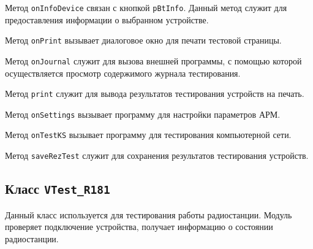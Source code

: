 \begin{enum}
	\item Метод \texttt{onInfoDevice} связан с кнопкой \texttt{pBtInfo}. Данный метод служит для предоставления
		информации о выбранном устройстве.

	\item Метод \texttt{onPrint} вызывает диалоговое окно для печати тестовой страницы.

	\item Метод \texttt{onJournal} служит для вызова внешней программы, с помощью которой осуществляется просмотр
		содержимого журнала тестирования.

	\item Метод \texttt{print} служит для вывода результатов тестирования устройств на печать.

	\item Метод \texttt{onSettings} вызывает программу для настройки параметров АРМ.

	\item Метод \texttt{onTestKS} вызывает программу для тестирования компьютерной сети.

	\item Метод \texttt{saveRezTest} служит для сохранения результатов тестирования устройств.
\end{enum}

\subsection{Класс \texttt{VTest\_R181}}
Данный класс используется для тестирования работы радиостанции. Модуль проверяет подключение устройства, получает
информацию о состоянии радиостанции.

